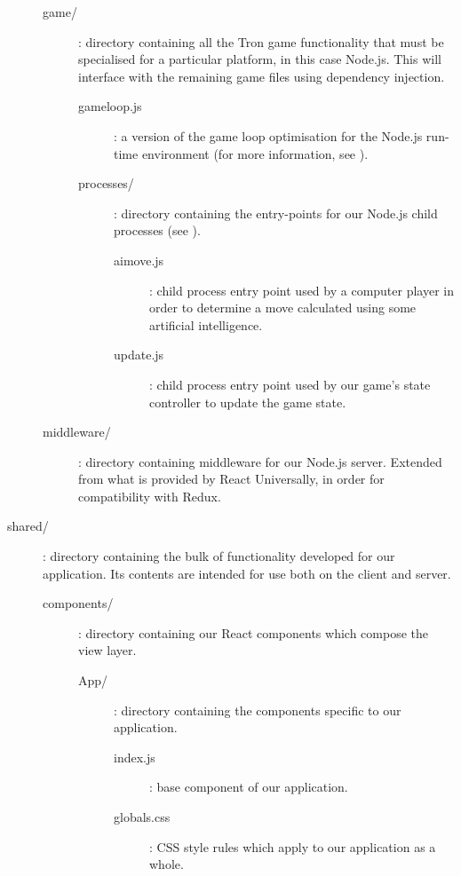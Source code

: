 \documentclass{standalone}
\begin{document}
\begin{formal}
\begin{description}
\begin{description}
		        	\item[game/]: directory containing all the Tron game functionality that must be specialised for a particular platform, in this case Node.js. This will interface with the remaining game files using dependency injection.
		        	\begin{description}
			        	\item[gameloop.js]: a version of the game loop optimisation for the Node.js run-time environment (for more information, see ).

			        	\item[processes/]: directory containing the entry-points for our Node.js child processes (see ).
		        		\begin{description}
				        	\item[aimove.js]: child process entry point used by a computer player in order to determine a move calculated using some artificial intelligence.
				        	\item[update.js]: child process entry point used by our game's state controller to update the game state.
				      	\end{description}
			      	\end{description}

		        	\item[middleware/]: directory containing middleware for our Node.js server. Extended from what is provided by React Universally, in order for compatibility with Redux.
		      	\end{description}

	      	\item[shared/]: directory containing the bulk of functionality developed for our application. Its contents are intended for use both on the client and server.
        		\begin{description}
		        	\item[components/]: directory containing our React components which compose the view layer.
		        	\begin{description}
		        		\item[App/]: directory containing the components specific to our application.
				      	\begin{description}
		        			\item[index.js]: base component of our application.
		        			\item[globals.css]: CSS style rules which apply to our application as a whole.


\end{description}
\end{description}
\end{description}
\end{description}
\end{formal}
\end{document}
